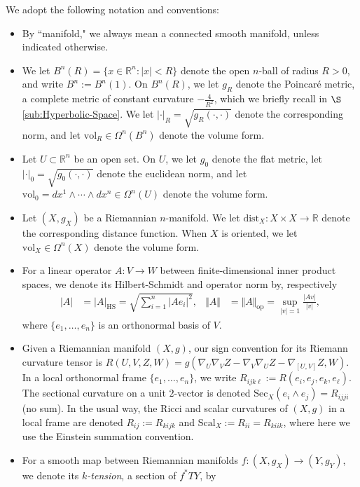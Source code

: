 \documentclass[11pt]{article}
\newcommand{\R}{\mathbb{R}}
\newcommand{\vol}{\mathrm{vol}}
\theoremstyle{definition}
\numberwithin{equation}{section}
\begin{document}
We adopt the following notation and conventions:
\begin{itemize}
\item By ``manifold," we always mean a connected smooth manifold, unless indicated otherwise.
\item We let $B^n(R) = \{x \in \R^n \colon |x| < R\}$ denote the open $n$-ball of radius $R > 0$, and write $B^n := B^n(1)$.  On $B^n(R)$, we let $g_R$ denote the Poincar\'{e} metric, a complete metric of constant curvature $-\frac{4}{R^2}$, which we briefly recall in $\S$\ref{sub:Hyperbolic-Space}.  We let $| \cdot |_R = \sqrt{g_R( \cdot, \cdot )}$ denote the corresponding norm, and let $\vol_R \in \Omega^n(B^n)$ denote the volume form.
\item Let $U \subset \R^n$ be an open set.  On $U$, we let $g_0$ denote the flat metric, let $| \cdot |_0 = \sqrt{g_0(\cdot, \cdot)}$ denote the euclidean norm, and let $\vol_0 = dx^1 \wedge \cdots \wedge dx^n \in \Omega^n(U)$ denote the volume form.
\item Let $(X, g_X)$ be a Riemannian $n$-manifold.  We let $\mathrm{dist}_X  \colon X \times X \to \R$ denote the corresponding distance function.  When $X$ is oriented, we let $\vol_X \in \Omega^n(X)$ denote the volume form.
\item For a linear operator $A \colon V \to W$ between finite-dimensional inner product spaces, we denote its Hilbert-Schmidt and operator norm by, respectively
\begin{align*}
|A| & = |A|_{\mathrm{HS}} = \sqrt{ \sum_{i=1}^n |Ae_i|^2 }, & \Vert A \Vert & = \Vert A \Vert_{\mathrm{op}} = \sup_{|v| = 1} \frac{|Av|}{|v|},
\end{align*}
where $\{e_1, \ldots, e_n\}$ is an orthonormal basis of $V$.
\item Given a Riemannian manifold $(X,g)$, our sign convention for its Riemann curvature tensor is $R(U,V,Z,W) = g(\nabla_U \nabla_V Z - \nabla_V \nabla_U Z - \nabla_{[U,V]} Z , W)$.  In a local orthonormal frame $\{e_1, \ldots, e_n\}$, we write $R_{ijk\ell} := R(e_i, e_j, e_k, e_\ell)$.  The sectional curvature on a unit $2$-vector is denoted $\mathrm{Sec}_X(e_i \wedge e_j) = R_{ijji}$ (no sum).  In the usual way, the Ricci and scalar curvatures of $(X,g)$ in a local frame are denoted $R_{ij} := R_{kijk}$ and $\mathrm{Scal}_X := R_{ii} = R_{kiik}$, where here we use the Einstein summation convention.
\item For a smooth map between Riemannian manifolds $f:(X,g_X) \to (Y,g_Y)$, we denote its \emph{$k$-tension}, a section of $f^*TY$, by

\end{itemize}
\end{document}
